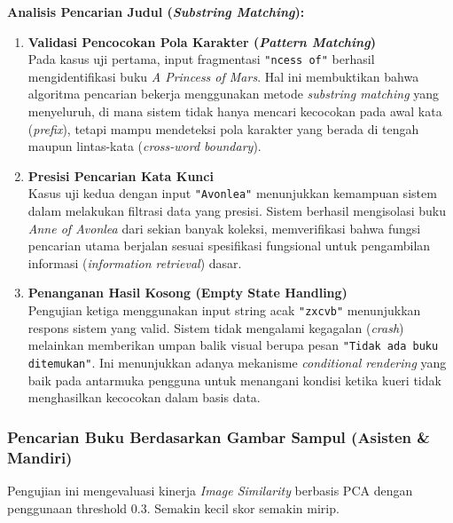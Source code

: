 \documentclass[12pt,a4paper]{article}
\begin{document}
\textbf{Analisis Pencarian Judul (\textit{Substring Matching}):}
\begin{enumerate}[label=\textbf{\arabic*.}]
    \item \textbf{Validasi Pencocokan Pola Karakter (\textit{Pattern Matching})} \\
    Pada kasus uji pertama, input fragmentasi \texttt{"ncess of"} berhasil mengidentifikasi buku \textit{A Princess of Mars}. Hal ini membuktikan bahwa algoritma pencarian bekerja menggunakan metode \textit{substring matching} yang menyeluruh, di mana sistem tidak hanya mencari kecocokan pada awal kata (\textit{prefix}), tetapi mampu mendeteksi pola karakter yang berada di tengah maupun lintas-kata (\textit{cross-word boundary}).

    \item \textbf{Presisi Pencarian Kata Kunci} \\
    Kasus uji kedua dengan input \texttt{"Avonlea"} menunjukkan kemampuan sistem dalam melakukan filtrasi data yang presisi. Sistem berhasil mengisolasi buku \textit{Anne of Avonlea} dari sekian banyak koleksi, memverifikasi bahwa fungsi pencarian utama berjalan sesuai spesifikasi fungsional untuk pengambilan informasi (\textit{information retrieval}) dasar.

    \item \textbf{Penanganan Hasil Kosong (Empty State Handling)} \\
    Pengujian ketiga menggunakan input string acak \texttt{"zxcvb"} menunjukkan respons sistem yang valid. Sistem tidak mengalami kegagalan (\textit{crash}) melainkan memberikan umpan balik visual berupa pesan \texttt{"Tidak ada buku ditemukan"}. Ini menunjukkan adanya mekanisme \textit{conditional rendering} yang baik pada antarmuka pengguna untuk menangani kondisi ketika kueri tidak menghasilkan kecocokan dalam basis data.
\end{enumerate}

\subsubsection{Pencarian Buku Berdasarkan Gambar Sampul (Asisten \& Mandiri)}
Pengujian ini mengevaluasi kinerja \textit{Image Similarity} berbasis PCA dengan penggunaan threshold 0.3. Semakin kecil skor semakin mirip.
\end{document}
